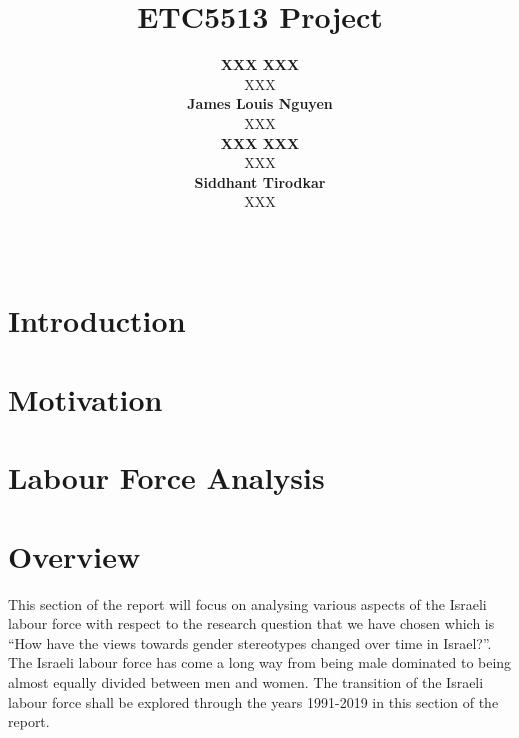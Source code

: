 \documentclass[11pt,a4paper,]{article}
\title{ETC5513 Project}
\author{\sf\Large\textbf{ XXX XXX}\\ {\sf\large XXX\\[0.5cm]} \sf\Large\textbf{ James Louis Nguyen}\\ {\sf\large XXX\\[0.5cm]} \sf\Large\textbf{ XXX XXX}\\ {\sf\large XXX\\[0.5cm]} \sf\Large\textbf{ Siddhant Tirodkar}\\ {\sf\large XXX\\[0.5cm]}}
\date{\sf\Date~\Month~\Year}
\makeatletter
\def\titlepage{\front{\expandafter{\@title}}{\@author}{\@organization}}
\makeatother
\begin{document}
\titlepage

\section*{Introduction}

\section*{Motivation}

\section*{}

\section*{}

\section*{}

\section*{Labour Force Analysis}

\hypertarget{overview}{%
\section{Overview}\label{overview}}

This section of the report will focus on analysing various aspects of the Israeli labour force with respect to the research question that we have chosen which is ``How have the views towards gender stereotypes changed over time in Israel?''. The Israeli labour force has come a long way from being male dominated to being almost equally divided between men and women. The transition of the Israeli labour force shall be explored through the years 1991-2019 in this section of the report.
\end{document}
